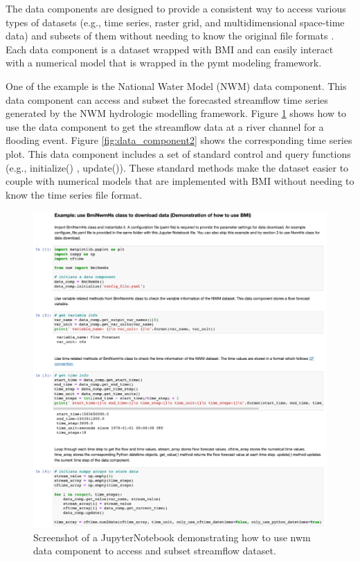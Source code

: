 \documentclass[12pt]{amsart}
\begin{document}
The data components are designed to provide a consistent way to access various types of datasets (e.g., time series, raster grid, and multidimensional space-time data) and subsets of them without needing to know the original file formats . Each data component is a dataset wrapped with BMI and can easily interact with a numerical model that is wrapped in the pymt modeling framework. 

One of the example is the National Water Model (NWM) data component. This data component can access and subset the forecasted streamflow time series generated by the NWM hydrologic modelling framework. Figure \ref{fig:data_component1} shows how to use the data component to get the streamflow data at a river channel for a flooding event. Figure \ref{fig:data_component2} shows the corresponding time series plot. This data component includes a set of standard control and query functions (e.g.,  initialize() , update()). These standard methods make the dataset easier to couple with numerical models that are implemented with BMI without needing to know the time series file format.

\begin{figure}[h!]
\centering
\includegraphics[scale=0.9]{Figures/data_component1.png}
\caption{Screenshot of a JupyterNotebook demonstrating how to use nwm data component to access and subset streamflow dataset. }
\label{fig:data_component1}
\end{figure}
\end{document}
